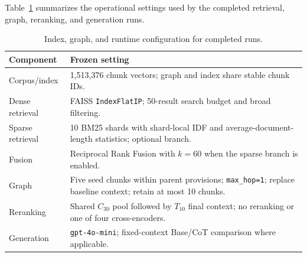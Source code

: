 Table~\ref{tab:index-graph-runtime-config} summarizes the operational settings
used by the completed retrieval, graph, reranking, and generation runs.

\begin{table}[t]
\centering
\scriptsize
\caption{Index, graph, and runtime configuration for completed runs.}
\label{tab:index-graph-runtime-config}
\begin{tabularx}{\columnwidth}{@{}p{}X@{}}
\toprule
\textbf{Component} & \textbf{Frozen setting} \\
\midrule
Corpus/index & 1,513,376 chunk vectors; graph and index share stable chunk IDs. \\
Dense retrieval & FAISS \texttt{IndexFlatIP}; 50-result search budget and broad filtering. \\
Sparse retrieval & 10 BM25 shards with shard-local IDF and average-document-length statistics; optional branch. \\
Fusion & Reciprocal Rank Fusion with $k=60$ when the sparse branch is enabled. \\
Graph & Five seed chunks within parent provisions; \texttt{max\_hop=1}; replace baseline context; retain at most 10 chunks. \\
Reranking & Shared $C_{30}$ pool followed by $T_{10}$ final context; no reranking or one of four cross-encoders. \\
Generation & \texttt{gpt-4o-mini}; fixed-context Base/CoT comparison where applicable. \\
\bottomrule
\end{tabularx}
\end{table}

